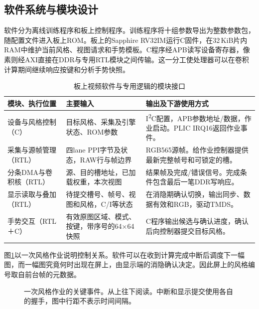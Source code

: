 \subsection{软件系统与模块设计}
软件分为离线训练程序和板上控制程序。训练程序将十组参数导出为整数参数包，随配置文件进入板上ROM。板上的Sapphire RV32IM运行C固件，在32\,KiB片内RAM中维护当前风格、视图请求和手势模板。C程序经APB读写设备寄存器，像素则经AXI直接在DDR与专用RTL模块之间传输。这一分工使处理器可以在卷积计算期间继续响应按键和分析手势快照。

\begin{table}[H]\centering\small
\caption{板上视频软件与专用逻辑的模块接口}\label{tab:swroles}
\begin{tabularx}{\linewidth}{@{}p{.23\linewidth}p{.32\linewidth}X@{}}\toprule
模块、执行位置 & 主要输入 & 输出及下游使用方式\\\midrule
设备与风格控制（C） & 目标风格、采集及引擎状态、ROM参数 & I\textsuperscript{2}C配置，APB参数地址/数据，作业启动。PLIC IRQ16返回作业事件。\\
采集与源帧管理（RTL） & 四lane PPI字节及状态，RAW行与帧边界 & RGB565源帧。给作业控制器提供最新完整帧号和可锁定的槽。\\
分条DMA与卷积核（RTL） & 源、目的槽地址，已加载权重，本次视图 & 结果帧及完成/错误信号。完成条件包含最后一笔DDR写响应。\\
显示读取与叠加（RTL） & 待提交槽号、帧号、视图和风格，C/I等状态 & 在消隐期确认切换，输出同步、数据有效和RGB，驱动TMDS。\\
手势交互（RTL＋C） & 有效原图区域、模式、按键，带序号的64×64快照 & C程序输出候选与确认进度，确认后向控制器提交目标风格。\\\bottomrule
\end{tabularx}\end{table}

图\ref{fig:frame_messages}以一次风格作业说明控制关系。软件可以在收到计算完成中断后调度下一幅图，而一幅图究竟何时出现在屏上，由显示端的消隐确认决定。因此屏上的风格编号取自前台帧的元数据。
\begin{figure}[H]\centering
{}
\caption{一次风格作业的关键事件。从上往下阅读。中断和显示提交使用各自的握手，图中行距不表示时间间隔。}\label{fig:frame_messages}
\end{figure}

